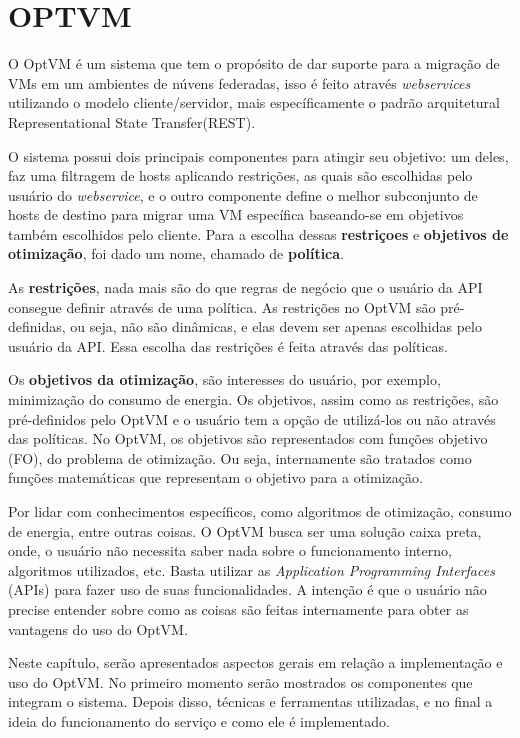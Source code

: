 \chapter{OPTVM}

O OptVM é um sistema que tem o propósito de dar suporte para a migração de VMs em um ambientes de núvens federadas,
isso é feito através \textit{webservices} utilizando o modelo cliente/servidor, mais específicamente o padrão arquitetural 
Representational State Transfer(REST).

O sistema possui dois principais componentes para atingir seu objetivo: um deles, faz uma filtragem de hosts aplicando restrições,
as quais são escolhidas pelo usuário do \textit{webservice}, e o 
outro componente define o melhor subconjunto de hosts de destino para migrar uma VM específica 
baseando-se em objetivos também escolhidos pelo cliente. 
Para a escolha dessas \textbf{restriçoes} e \textbf{objetivos de otimização}, foi dado um nome,
chamado de \textbf{política}. 

As \textbf{restrições}, nada mais são do que regras de negócio que o usuário da API consegue definir através de uma política.
As restrições no OptVM são pré-definidas, ou seja, não são dinâmicas, e elas devem ser apenas escolhidas pelo 
usuário da API. Essa escolha das restrições é feita através das políticas.

Os \textbf{objetivos da otimização}, são interesses do usuário, por exemplo, minimização do consumo de energia. Os objetivos,
assim como as restrições, são pré-definidos pelo OptVM e o usuário tem a opção de utilizá-los ou não através das políticas.
No OptVM, os objetivos são representados com funções objetivo (FO), do problema de otimização. Ou seja, internamente são tratados
como funções matemáticas que representam o objetivo para a otimização.

Por lidar com conhecimentos específicos, como algoritmos de otimização, consumo de energia, entre outras coisas. 
O OptVM busca ser uma solução caixa preta, onde, o usuário não necessita saber nada sobre o funcionamento interno, 
algoritmos utilizados, etc. Basta utilizar as \textit{Application Programming Interfaces} (APIs) para fazer uso de suas funcionalidades.
A intenção é que o usuário não precise entender sobre como as coisas são feitas internamente para obter as vantagens do uso do OptVM.

Neste capítulo, serão apresentados aspectos gerais em relação a implementação e uso do OptVM. 
No primeiro momento serão mostrados os componentes que integram o sistema. 
Depois disso, técnicas e ferramentas utilizadas, e no final a ideia do funcionamento do serviço e como ele é
implementado.

